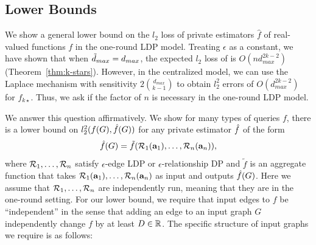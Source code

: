 \subsection{Lower Bounds}
\label{sub:lower_bounds}

We show a general lower bound on the $l_2$ loss of private estimators $\hat{f}$ of
real-valued functions $f$ in the one-round LDP model. Treating $\epsilon$ as a
constant, we have shown that 
when $\tilde{d}_{max}=d_{max}$, 
the expected $l_2$ loss of  is 
$O(nd_{max}^{2k-2})$
(Theorem~\ref{thm:k-stars}). 
However, in
the centralized 
model, we can use
the Laplace mechanism with sensitivity 
$2\binom{d_{max}}{k-1}$ 
to obtain $l_2^2$ errors of $O(d_{max}^{2k-2})$ 
for $f_{k\star}$. 
Thus, we ask
if 
the factor of $n$ is 
necessary 
in the one-round LDP model.

We 
answer this question affirmatively.
We show for many types of queries $f$, there is a lower bound on 
$l_2^2(f(G), \hat{f}(G))$ 
for any private estimator $\hat{f}$ of the form
\begin{equation}\label{eq:one-round-lower}
  \hat{f}(G) = \tilde{f}(\mathcal{R}_1(\mathbf{a}_1), \ldots, \mathcal{R}_n(\mathbf{a}_n)),
\end{equation}
where 
$\mathcal{R}_1, \ldots, \mathcal{R}_n$ satisfy 
$\epsilon$-edge LDP or $\epsilon$-relationship DP 
and $\tilde{f}$ is an aggregate function that takes $\mathcal{R}_1(\mathbf{a}_1), \ldots, \mathcal{R}_n(\mathbf{a}_n)$ as input and outputs $\hat{f}(G)$. 
Here we assume that $\mathcal{R}_1, \ldots, \mathcal{R}_n$ 
are independently run, meaning that they are in the one-round
setting.
% 
% 
For our 
lower bound,
we 
require 
that 
input edges to $f$ 
be ``independent'' in the sense that 
adding an edge to an input graph $G$  
independently 
change 
$f$ by at least $D \in \mathbb{R}$. 
The specific structure of input graphs we require is as follows:

